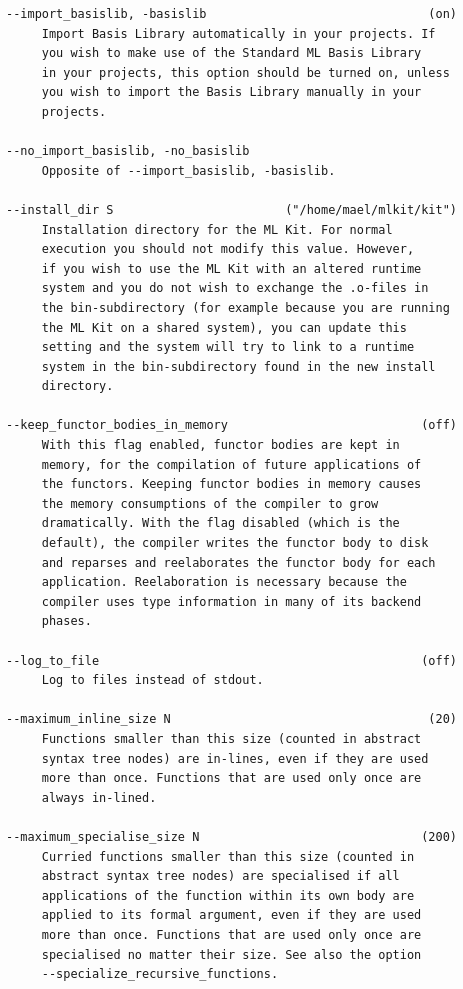 \documentclass[12pt]{book}
\begin{document}
\begin{verbatim}
--import_basislib, -basislib                               (on)
     Import Basis Library automatically in your projects. If 
     you wish to make use of the Standard ML Basis Library
     in your projects, this option should be turned on, unless
     you wish to import the Basis Library manually in your
     projects.

--no_import_basislib, -no_basislib
     Opposite of --import_basislib, -basislib.

--install_dir S                        ("/home/mael/mlkit/kit")
     Installation directory for the ML Kit. For normal
     execution you should not modify this value. However,
     if you wish to use the ML Kit with an altered runtime
     system and you do not wish to exchange the .o-files in
     the bin-subdirectory (for example because you are running
     the ML Kit on a shared system), you can update this
     setting and the system will try to link to a runtime
     system in the bin-subdirectory found in the new install
     directory.

--keep_functor_bodies_in_memory                           (off)
     With this flag enabled, functor bodies are kept in
     memory, for the compilation of future applications of
     the functors. Keeping functor bodies in memory causes
     the memory consumptions of the compiler to grow
     dramatically. With the flag disabled (which is the
     default), the compiler writes the functor body to disk
     and reparses and reelaborates the functor body for each
     application. Reelaboration is necessary because the
     compiler uses type information in many of its backend
     phases.

--log_to_file                                             (off)
     Log to files instead of stdout.

--maximum_inline_size N                                    (20)
     Functions smaller than this size (counted in abstract
     syntax tree nodes) are in-lines, even if they are used
     more than once. Functions that are used only once are
     always in-lined.

--maximum_specialise_size N                               (200)
     Curried functions smaller than this size (counted in
     abstract syntax tree nodes) are specialised if all
     applications of the function within its own body are
     applied to its formal argument, even if they are used
     more than once. Functions that are used only once are
     specialised no matter their size. See also the option
     --specialize_recursive_functions.


\end{verbatim}
\end{document}
